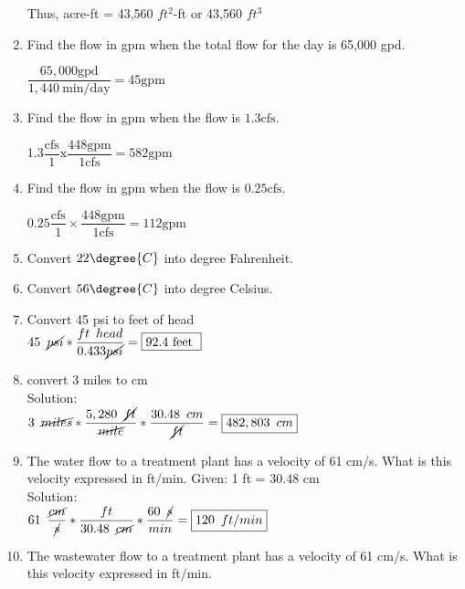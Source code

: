 \documentclass{article}
\begin{document}
\begin{enumerate}
Thus, acre-ft  = 43,560 $ft^2$-ft or 43,560 $ft^3$\\

\item Find the flow in gpm when the total flow for the day is 65,000 gpd.


$
\dfrac{65,000 \mathrm{gpd}}{1,440 \mathrm{~min} / \mathrm{day}}=45 \mathrm{gpm}
$


\item Find the flow in gpm when the flow is $1.3 \mathrm{cfs}$.

$
1.3 \dfrac{\mathrm{cfs}}{1} \mathrm{x} \dfrac{448 \mathrm{gpm}}{1 \mathrm{cfs}}=582 \mathrm{gpm}
$


\item Find the flow in gpm when the flow is $0.25 \mathrm{cfs}$.

$
0.25 \dfrac{\mathrm{cfs}}{1} \times \dfrac{448 \mathrm{gpm}}{1 \mathrm{cfs}}=112 \mathrm{gpm}
$

\item Convert $22\degree{C}$ into degree Fahrenheit.

\item Convert $56\degree{C}$ into degree Celsius.

\item Convert 45 psi to feet of head\\

 
$
45 \enspace \cancel{psi}*\dfrac{ft \enspace head}{0.433\cancel{psi}}=\boxed{92.4 \text { feet }}
$


\item convert 3 miles to cm\\
Solution:\\
$3 \enspace \cancel{miles} * \dfrac{5,280 \enspace \cancel{ft}}{\cancel{mile}}*\dfrac{30.48 \enspace cm}{\cancel{ft}}=\boxed{482,803 \enspace cm}$

\item The water flow to a treatment plant has a velocity of 61 cm/s. What is this velocity expressed in ft/min. Given: 1 ft = 30.48 cm\\
Solution:\\
$61 \enspace \dfrac{\cancel{cm}}{\cancel{s}} * \dfrac{ft}{30.48 \enspace \cancel{cm}}* \dfrac{60 \enspace \cancel{s}}{min} =  \boxed{120 \enspace ft/min}$\\

\item The wastewater flow to a treatment plant has a velocity of 61 cm/s. What is this velocity expressed in ft/min.


\end{enumerate}
\end{document}
